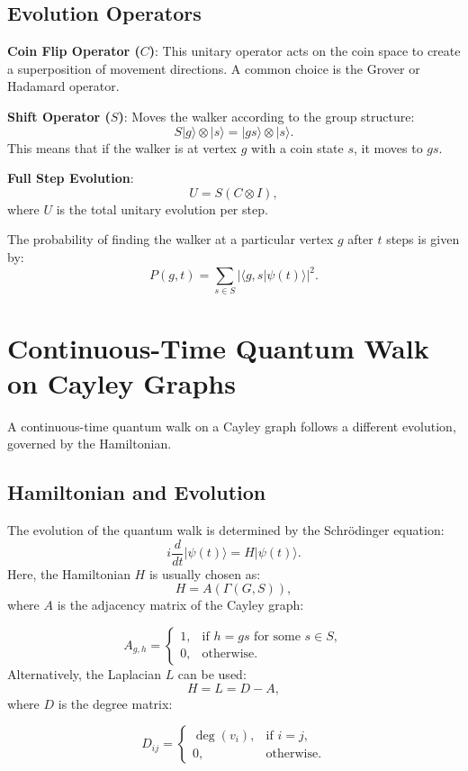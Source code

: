 \documentclass[11pt]{article}
\theoremstyle{definition}
\begin{document}
\subsection*{Evolution Operators}
\textbf{Coin Flip Operator (\( C \))}: This unitary operator acts on the coin space to create a superposition of movement directions. A common choice is the Grover or Hadamard operator.

\textbf{Shift Operator (\( S \))}: Moves the walker according to the group structure:
\[
S |g\rangle \otimes |s\rangle = |gs\rangle \otimes |s\rangle.
\]
This means that if the walker is at vertex \( g \) with a coin state \( s \), it moves to \( gs \).

\textbf{Full Step Evolution}:
\[
U = S (C \otimes I),
\]
where \( U \) is the total unitary evolution per step.

The probability of finding the walker at a particular vertex \( g \) after \( t \) steps is given by:
\[
P(g, t) = \sum_{s \in S} |\langle g, s | \psi(t) \rangle |^2.
\]


\section*{Continuous-Time Quantum Walk on Cayley Graphs}

A continuous-time quantum walk on a Cayley graph follows a different evolution, governed by the Hamiltonian.

\subsection*{Hamiltonian and Evolution}
The evolution of the quantum walk is determined by the Schrödinger equation:
\[
i \frac{d}{dt} |\psi(t)\rangle = H |\psi(t)\rangle.
\]
Here, the Hamiltonian \( H \) is usually chosen as:
\[
H = A(\Gamma(G,S)),
\]
where \( A \) is the adjacency matrix of the Cayley graph:

\[
A_{g,h} =
\begin{cases}
1, & \text{if } h = gs \text{ for some } s \in S, \\
0, & \text{otherwise}.
\end{cases}
\]
 Alternatively, the Laplacian \( L \) can be used:
\[
H = L = D - A,
\]
where \( D \) is the degree matrix:

\[
D_{ij} =
\begin{cases}
\deg(v_i), & \text{if } i = j, \\
0, & \text{otherwise}.
\end{cases}
\]
\end{document}
